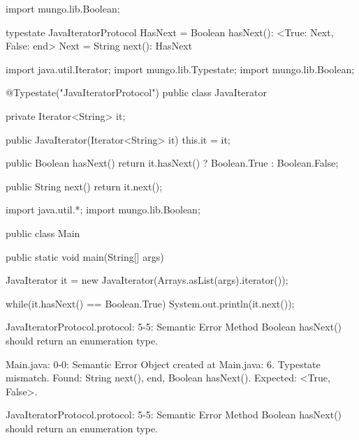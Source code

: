 \begin{code}
import mungo.lib.Boolean;

typestate JavaIteratorProtocol {
  HasNext = {
    Boolean hasNext(): <True: Next, False: end>
  }
  Next = {
    String next(): HasNext
  }
}\end{code}

\begin{code}
import java.util.Iterator;
import mungo.lib.Typestate;
import mungo.lib.Boolean;

@Typestate("JavaIteratorProtocol")
public class JavaIterator {

  private Iterator<String> it;

  public JavaIterator(Iterator<String> it) {
    this.it = it;
  }

	public Boolean hasNext() {
    return it.hasNext() ? Boolean.True : Boolean.False;
  }

  public String next() {
    return it.next();
  }

}\end{code}

\begin{code}
import java.util.*;
import mungo.lib.Boolean;

public class Main {
	public static void main(String[] args) {
		JavaIterator it = new JavaIterator(Arrays.asList(args).iterator());
    
    while(it.hasNext() == Boolean.True){
      System.out.println(it.next());
    }
	}
}\end{code}

\lstset{caption=Original Mungo output}
\begin{code}

JavaIteratorProtocol.protocol: 5-5: Semantic Error
		Method Boolean hasNext() should return an enumeration type.

Main.java: 0-0: Semantic Error
		Object created at Main.java: 6. Typestate mismatch. Found: String next(), end, Boolean hasNext(). Expected: <True, False>.

JavaIteratorProtocol.protocol: 5-5: Semantic Error
		Method Boolean hasNext() should return an enumeration type.
\end{code}

\lstset{caption=New Mungo output}
\begin{code}
\end{code}

